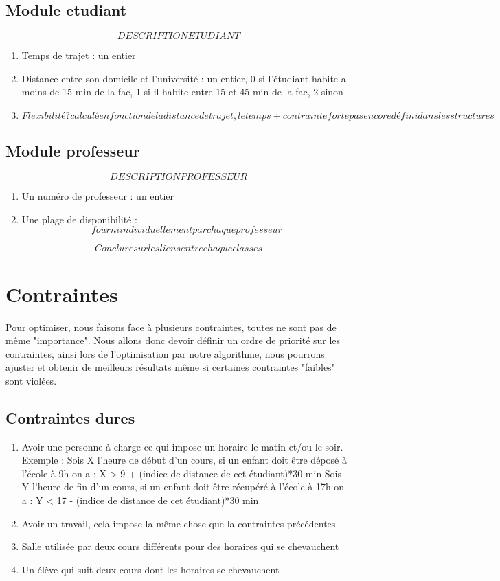 \documentclass[a4paper,11pt]{article}
\begin{document}
	\subsection{Module etudiant}
		$$DESCRIPTION ETUDIANT$$
		\begin{enumerate}
			\item Temps de trajet : un entier
			\item Distance entre son domicile et l'université : un entier, 0 si l'étudiant habite a moins de 15 min de la fac, 1 si il habite
			entre 15 et 45 min de la fac, 2 sinon
			\item $$Flexibilité ? calculé en fonction de la distance de trajet, le temps + contrainte forte pas encore défini dans les structures $$
			\end{enumerate}
	\subsection{Module professeur}
		$$DESCRIPTION PROFESSEUR$$
		\begin{enumerate}
			\item Un numéro de professeur : un entier
			\item Une plage de disponibilité : $$fourni individuellement par chaque professeur$$
			\end{enumerate}
	$$Conclure sur les liens entre chaque classes$$
\section{Contraintes}
	Pour optimiser, nous faisons face à plusieurs contraintes, toutes ne sont pas 
	de même "importance". Nous allons donc devoir définir un ordre de priorité sur 
	les contraintes, ainsi lors de l'optimisation par notre algorithme, nous 
	pourrons ajuster et obtenir de meilleurs résultats même si certaines contraintes
	"faibles" sont violées.\\
	\subsection{Contraintes dures}
		\begin{enumerate}
			\item Avoir une personne à charge ce qui impose un horaire le matin et/ou le soir.
			Exemple : Sois X l'heure de début d'un cours, si un enfant doit être déposé à l'école à 9h on a : X > 9 + (indice de distance de cet étudiant)*30 min
					  Sois Y l'heure de fin d'un cours, si un enfant doit être récupéré à l'école à 17h on a : Y < 17 - (indice de distance de cet étudiant)*30 min
			\item Avoir un travail, cela impose la même chose que la contraintes précédentes
			\item Salle utilisée par deux cours différents pour des horaires 
				qui se chevauchent
			\item Un élève qui suit deux cours dont les horaires se chevauchent
		\end{enumerate}
\end{document}
